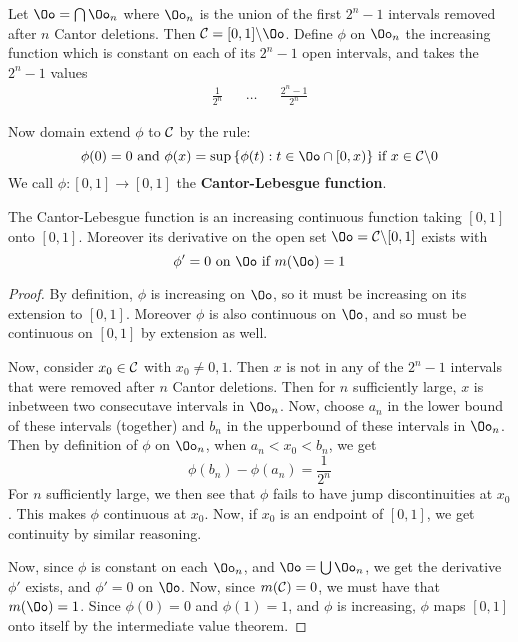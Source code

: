 \begin{definition}
    Let $\Oo=\bigcap{\Oo_n}$ where $\Oo_n$ is the union of the first  $2^n-1$
    intervals removed after $n$ Cantor deletions. Then $\Cc=\com{[0,1]}{\Oo}$.
    Define $\phi$ on $\Oo_n$ the increasing function which is constant on each
    of its $2^n-1$ open intervals, and takes the  $2^n-1$ values
    \begin{align*}
        \frac{1}{2^n}   &&  \dots   &&   \frac{2^n-1}{2^n}
    \end{align*}

    Now domain extend $\phi$ to $\mathcal{C}$ by the rule:
    \begin{equation*}
        \phi(0)=0 \text{ and } \phi(x)=\sup{\{\phi(t) : t \in \Oo \cap [0,x)\}}
        \text{ if } x \in \com{\Cc}{0}
    \end{equation*}
    We call $\phi:[0,1] \xrightarrow{} [0,1]$ the \textbf{Cantor-Lebesgue
    function}.
\end{definition}

\begin{theorem}\label{8.6.2}
    The Cantor-Lebesgue function is an increasing continuous function taking
    $[0,1]$ onto $[0,1]$. Moreover its derivative on the open set
    $\Oo=\com{\Cc}{[0,1]}$ exists with
    \begin{equation*}
        \phi'=0 \text{ on } \Oo \text{ if } m(\Oo)=1
    \end{equation*}
\end{theorem}
\begin{proof}
    By definition, $\phi$ is increasing on $\Oo$, so it must be increasing on
    its extension to  $[0,1]$. Moreover $\phi$ is also continuous on  $\Oo$, and
    so must be continuous on  $[0,1]$ by extension as well.

    Now, consider $x_0 \in \mathcal{C}$ with $x_0 \neq 0,1$. Then $x$ is not in any of
    the  $2^n-1$ intervals that were removed after  $n$ Cantor deletions. Then
    for  $n$ sufficiently large,  $x$ is inbetween two consecutave intervals in
     $\Oo_n$. Now, choose  $a_n$ in the lower bound of these intervals
     (together) and $b_n$ in the upperbound of these intervals in $\Oo_n$. Then
     by definition of  $\phi$ on  $\Oo_n$, when  $a_n<x_0<b_n$, we get
     \begin{equation*}
         \phi(b_n)-\phi(a_n)=\frac{1}{2^n}
     \end{equation*}
     For $n$ sufficiently large, we then see that  $\phi$ fails to have jump
     discontinuities at  $x_0$. This makes $\phi$ continuous at  $x_0$. Now, if
     $x_0$ is an endpoint of $[0,1]$, we get continuity by similar reasoning.

     Now, since $\phi$ is constant on each  $\Oo_n$, and  $\Oo=\bigcup{\Oo_n}$,
     we get the derivative $\phi'$ exists, and $\phi'=0$ on $\Oo$. Now, since
     $m(\mathcal{C})=0$, we must have that $m(\Oo)=1$. Since $\phi(0)=0$ and
     $\phi(1)=1$, and $\phi$ is increasing,  $\phi$ maps  $[0,1]$ onto itself by
     the intermediate value theorem.
\end{proof}


